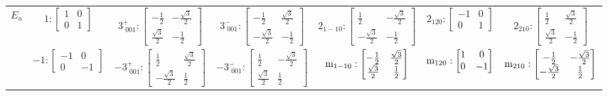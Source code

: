 \documentclass[fleqn,8pt,landscape]{jsarticle}
\begin{document}
\begin{longtable}{ccccccc}
$ E_{u} $ & $ 1:\begin{bmatrix} 1 & 0 \\ 0 & 1 \end{bmatrix} $ & $ 3^{+}_{\,\,001}:\begin{bmatrix} - \frac{1}{2} & - \frac{\sqrt{3}}{2} \\ \frac{\sqrt{3}}{2} & - \frac{1}{2} \end{bmatrix} $ & $ 3^{-}_{\,\,001}:\begin{bmatrix} - \frac{1}{2} & \frac{\sqrt{3}}{2} \\ - \frac{\sqrt{3}}{2} & - \frac{1}{2} \end{bmatrix} $ & $ 2{}_{1-10}:\begin{bmatrix} \frac{1}{2} & - \frac{\sqrt{3}}{2} \\ - \frac{\sqrt{3}}{2} & - \frac{1}{2} \end{bmatrix} $ & $ 2{}_{120}:\begin{bmatrix} -1 & 0 \\ 0 & 1 \end{bmatrix} $ & $ 2{}_{210}:\begin{bmatrix} \frac{1}{2} & \frac{\sqrt{3}}{2} \\ \frac{\sqrt{3}}{2} & - \frac{1}{2} \end{bmatrix} $ \\
& $ -1:\begin{bmatrix} -1 & 0 \\ 0 & -1 \end{bmatrix} $ & $ -3^{+}_{\,\,001}:\begin{bmatrix} \frac{1}{2} & \frac{\sqrt{3}}{2} \\ - \frac{\sqrt{3}}{2} & \frac{1}{2} \end{bmatrix} $ & $ -3^{-}_{\,\,001}:\begin{bmatrix} \frac{1}{2} & - \frac{\sqrt{3}}{2} \\ \frac{\sqrt{3}}{2} & \frac{1}{2} \end{bmatrix} $ & $ {\rm m}_{1-10}:\begin{bmatrix} - \frac{1}{2} & \frac{\sqrt{3}}{2} \\ \frac{\sqrt{3}}{2} & \frac{1}{2} \end{bmatrix} $ & $ {\rm m}_{120}:\begin{bmatrix} 1 & 0 \\ 0 & -1 \end{bmatrix} $ & $ {\rm m}_{210}:\begin{bmatrix} - \frac{1}{2} & - \frac{\sqrt{3}}{2} \\ - \frac{\sqrt{3}}{2} & \frac{1}{2} \end{bmatrix} $ \\
\end{longtable}
\end{document}
